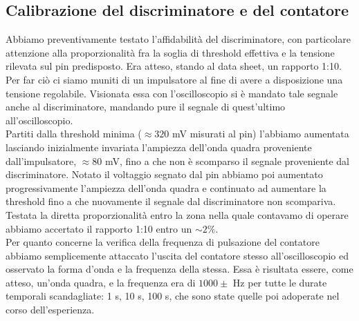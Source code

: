 \documentclass[a4paper,10pt]{article}
\begin{document}
\subsection{Calibrazione del discriminatore e del contatore}
Abbiamo preventivamente testato l'affidabilità del discriminatore, con particolare attenzione alla proporzionalità fra la soglia di threshold effettiva e la tensione rilevata sul pin predisposto. Era atteso, stando al data sheet, un rapporto 1:10.\\
Per far ciò ci siamo muniti di un impulsatore al fine di avere a disposizione una tensione regolabile. Visionata essa con l'oscilloscopio si è mandato tale segnale anche al discriminatore, mandando pure il segnale di quest'ultimo all'oscilloscopio.\\
Partiti dalla threshold minima ($\approx320$ mV misurati al pin) l'abbiamo aumentata lasciando inizialmente invariata l'ampiezza dell'onda quadra proveniente dall'impulsatore, $\approx80$ mV, fino a che non è scomparso il segnale proveniente dal discriminatore. Notato il voltaggio segnato dal pin abbiamo poi aumentato progressivamente l'ampiezza dell'onda quadra e continuato ad aumentare la threshold fino a che nuovamente il segnale dal discriminatore non scompariva. Testata la diretta proporzionalità entro la zona nella quale contavamo di operare abbiamo accertato il rapporto 1:10 entro un $\sim2\%$.
\\Per quanto concerne la verifica della frequenza di pulsazione del contatore abbiamo semplicemente attaccato l'uscita del contatore stesso all'oscilloscopio ed osservato la forma d'onda e la frequenza della stessa. Essa è risultata essere, come atteso, un'onda quadra, e la frequenza era di $1000\pm$ Hz per tutte le durate temporali scandagliate: 1 s, 10 s, 100 s, che sono state quelle poi adoperate nel corso dell'esperienza.
\end{document}
